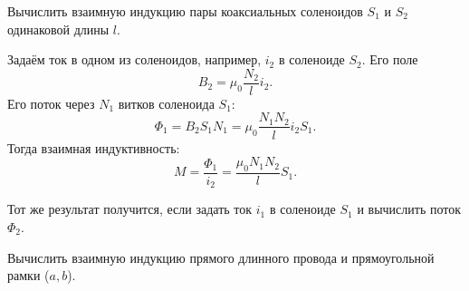     \begin{example}
        Вычислить взаимную индукцию пары коаксиальных соленоидов \( S_1 \) и
        \( S_2 \) одинаковой длины \( l \).
    \end{example}
    
    \begin{solution}
        Задаём ток в одном из соленоидов, например, \( i_2 \) в соленоиде
        \( S_2 \). Его поле
        \[
            B_2 = \mu_0 \frac{N_2}{l} i_2.
        \]
        Его поток через \( N_1 \) витков соленоида \( S_1 \):
        \[
            \Phi_1 = B_2 S_1N_1 = \mu_0 \frac{N_1N_2}{l} i_2S_1.
        \]
        Тогда взаимная индуктивность:
        \[
            M = \frac{\Phi_1}{i_2} = \frac{\mu_0 N_1N_2}{l}S_1.
        \]
    \end{solution}
    
    \begin{remark}
        Тот же результат получится, если задать ток \( i_1 \) в соленоиде
        \( S_1 \) и вычислить поток \( \Phi_2 \).
    \end{remark}
    
    \begin{example}
        Вычислить взаимную индукцию прямого длинного провода и прямоугольной рамки (\( a, b\)).
    \end{example}
    
